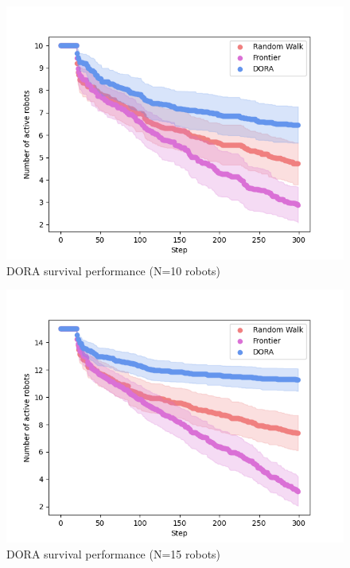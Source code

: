 \begin{figure}
    \includegraphics[width=16cm]{figures/dora_explorer/activerobots_10.png}
        \caption[DORA survival performance (N=10 robots)]{DORA survival performance (N=10 robots)}
        \label{results:failures10}
\end{figure}

\begin{figure}
    \includegraphics[width=16cm]{figures/dora_explorer/activerobots_15.png}
        \caption[DORA survival performance (N=15 robots)]{DORA survival performance (N=15 robots)}
        \label{results:failures15}
\end{figure}

